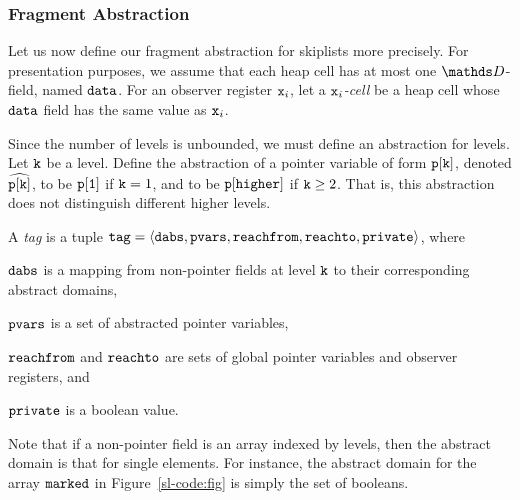 \subsubsection{Fragment Abstraction}
Let us now define our fragment abstraction for skiplists more precisely.
For presentation purposes, we assume that each heap cell has at most one
$\ddomain$-field, named ${\tt data}$.
For an observer register $\mathtt{x}_i$, let a {\em $\mathtt{x}_i$-cell} be a heap cell whose
${\tt data}$ field has the same value as $\mathtt{x}_i$.

Since the number of levels is unbounded, we must define an abstraction for
levels.
Let ${\tt k}$ be a level.
Define the abstraction of a pointer variable of form $\tt p[k]$,
denoted $\widehat{\mathtt{p[k]}}$,
to be $\tt p[1]$ if ${\tt k} = 1$, and to be  $\tt p[higher]$
if ${\tt k} \geq 2$.
That is, this abstraction does not distinguish different higher levels.

A {\em tag} is a tuple $\mathtt{tag} = \left\langle\mathtt{dabs},\mathtt{pvars},\mathtt{reachfrom},\mathtt{reachto},\mathtt{private}\right\rangle$, where
\begin{inparaenum}[(i)]
\item
  $\mathtt{dabs}$ is a mapping from non-pointer fields at level ${\tt k}$
  to their corresponding abstract domains,
\item
  $\mathtt{pvars}$ is a set of abstracted pointer variables,
 \item
   $\mathtt{reachfrom}$ and $\mathtt{reachto}$ are sets of global pointer variables and observer registers, and
  \item $\mathtt{private}$ is a boolean value.
\end{inparaenum}
Note that if a non-pointer field is an array indexed by levels, then
the abstract domain is that for single elements. For instance, the abstract
domain for the array ${\tt marked}$ in Figure~\ref{sl-code:fig} is simply the
set of booleans.


